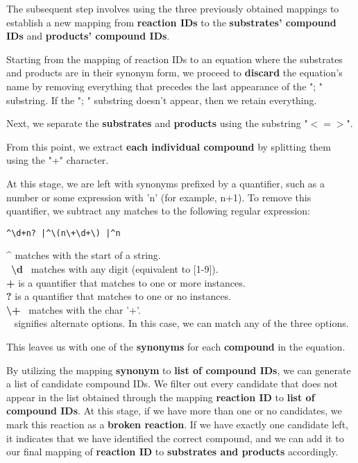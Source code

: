 \noindent\hrulefill

The subsequent step involves using the three previously obtained mappings to establish a new mapping from \textbf{reaction IDs} to the \textbf{substrates' compound IDs} and \textbf{products' compound IDs}.

Starting from the mapping of reaction IDs to an equation where the substrates and products are in their synonym form, we proceed to \textbf{discard} the equation's name by removing everything that precedes the last appearance of the "; " substring. If the "; " substring doesn't appear, then we retain everything.

Next, we separate the \textbf{substrates} and \textbf{products} using the substring "$<=>$".

From this point, we extract \textbf{each individual compound} by splitting them using the "+" character.

At this stage, we are left with synonyms prefixed by a quantifier, such as a number or some expression with 'n' (for example, n+1). To remove this quantifier, we subtract any matches to the following regular expression:

\begin{lstlisting}[style=regexStyle]
^\d+n? |^\(n\+\d+\) |^n 
\end{lstlisting}

\textbf{\textasciicircum} matches with the start of a string.\\
~\textbf{\textbackslash d}~ matches with any digit (equivalent to [1-9]). \\
\textbf{+} is a quantifier that matches to one or more instances.\\
\textbf{?} is a quantifier that matches to one or no instances.\\
\textbf{\textbackslash +}~ matches with the char '+'.\\
\textbf{\textbar}~ signifies alternate options. In this case, we can match any of the three options.

This leaves us with one of the \textbf{synonyms} for each \textbf{compound} in the equation.

By utilizing the mapping \textbf{synonym} to \textbf{list of compound IDs}, we can generate a list of candidate compound IDs. We filter out every candidate that does not appear in the list obtained through the mapping \textbf{reaction ID} to \textbf{list of compound IDs}.
At this stage, if we have more than one or no candidates, we mark this reaction as a \textbf{broken reaction}. If we have exactly one candidate left, it indicates that we have identified the correct compound, and we can add it to our final mapping of \textbf{reaction ID} to \textbf{substrates and products} accordingly.


